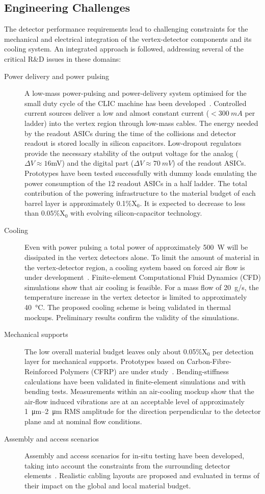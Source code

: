 \subsection{Engineering Challenges}
The detector performance requirements lead to challenging constraints
for the mechanical and electrical integration of the vertex-detector
components and its cooling system. An integrated approach is followed,
addressing several of the critical R\&D issues in these domains:
\begin{description}
\item[Power delivery and power pulsing] A low-mass power-pulsing and power-delivery
system optimised for the small duty cycle of the CLIC machine has been
developed~\cite{1748-0221-8-01-C01057}. Controlled current sources
deliver a low and almost constant current ($<\SI{300}{mA}$ per ladder)
into the vertex region through low-mass cables. The energy needed by the readout ASICs during the time of the collisions
and detector readout is stored locally in silicon capacitors. Low-dropout regulators provide the necessary stability
of the output voltage for the analog ($\Delta V\approx16$mV) and the digital part
($\Delta V\approx\SI{70}{mV}$) of the readout ASICs.
Prototypes have been tested successfully with dummy loads emulating the power consumption
of the 12 readout ASICs in a half ladder. The total contribution of the
powering infrastructure to the material budget of each barrel layer is
approximately 0.1\%X$_0$. It is expected to decrease to less than $0.05\%$X$_0$ with evolving silicon-capacitor technology.
\item[Cooling] Even with power pulsing a total power of approximately \SI{500}{W} will be dissipated in the vertex detectors alone. To limit the amount of material in the vertex-detector region, a cooling
system based on forced air flow is under development~\cite{DuarteRamos:1572989}. Finite-element Computational Fluid Dynamics (CFD) simulations show that air cooling is feasible. For a mass flow of \SI{20}{g/s}, the temperature increase
in the vertex detector is limited to approximately \SI{40}{\degreeCelsius}. The proposed cooling scheme is being
validated in thermal mockups. Preliminary results confirm the validity of the simulations.
\item[Mechanical supports] The low overall material budget leaves only about 0.05\%X$_0$ per
detection layer for mechanical supports. Prototypes based on Carbon-Fibre-Reinforced Polymers
(CFRP) are under study~\cite{VillarejoBermudez:1982810}. Bending-stiffness calculations have been validated in
finite-element simulations
and with bending tests. Measurements within an air-cooling mockup show
that the air-flow induced vibrations are at an acceptable level of approximately \SIrange{1}{2}{\micro\meter} RMS
amplitude for the direction perpendicular to the detector plane and at nominal flow conditions.
\item[Assembly and access scenarios]
Assembly and access scenarios for in-situ testing have been developed,
taking into account the constraints from the surrounding detector elements~\cite{VillarejoBermudez:1982810}.
Realistic cabling layouts are proposed and evaluated in terms of their impact on the
global and local material budget.
\end{description}

